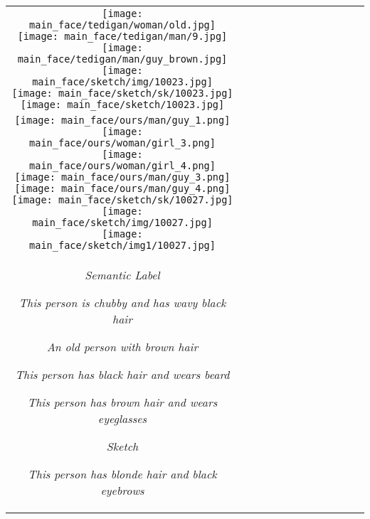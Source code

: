 \documentclass[10pt,twocolumn,letterpaper]{article}
\begin{document}
{\begin{center}
{\begin{tabular}{c c c c c c c c c c c c}
\texttt{[image: main\_face/tedigan/woman/old.jpg]}
\hspace{1mm}
\texttt{[image: main\_face/tedigan/man/9.jpg]}
\texttt{[image: main\_face/tedigan/man/guy\_brown.jpg]}
\hspace{4mm}
\texttt{[image: main\_face/sketch/img/10023.jpg]}
\texttt{[image: main\_face/sketch/sk/10023.jpg]}
\texttt{[image: main\_face/sketch/10023.jpg]}
\tabularnewline
\texttt{[image: main\_face/ours/man/guy\_1.png]}
\hspace{2mm}
\raisebox{0.15in}{\rotatebox{90}{\footnotesize OURS}}
\texttt{[image: main\_face/ours/woman/girl\_3.png]}
\texttt{[image: main\_face/ours/woman/girl\_4.png]}
\hspace{1.5mm}
\texttt{[image: main\_face/ours/man/guy\_3.png]}
\texttt{[image: main\_face/ours/man/guy\_4.png]}
\hspace{4mm}
\texttt{[image: main\_face/sketch/sk/10027.jpg]}
\texttt{[image: main\_face/sketch/img/10027.jpg]}
\texttt{[image: main\_face/sketch/img1/10027.jpg]}
\tabularnewline
\begin{minipage}{0.11\linewidth}
\vspace{-20pt}
  \hspace{-2mm}\textit{Semantic Label}
\end{minipage}
\hspace{3mm}
\begin{minipage}{0.11\linewidth}
  \textit{\color{violet}This person is chubby and has wavy black hair}
\end{minipage}
\begin{minipage}{0.11\linewidth}
\vspace{-10pt}
 \textit{\color{orange}An old person with brown hair}
\end{minipage}
\hspace{0.1mm}
\begin{minipage}{0.11\linewidth}
\vspace{0pt}
\textit{\color{violet}This person has black hair and wears beard}
\end{minipage}
\begin{minipage}{0.11\linewidth}
\vspace{0pt}
\textit{\color{orange}This person has brown hair and wears eyeglasses}
\end{minipage}
\hspace{3mm}
\begin{minipage}{0.11\linewidth}
\vspace{-20pt}
\hspace{15pt}\textit{Sketch}
\end{minipage}
\begin{minipage}{0.11\linewidth}
\textit{\color{violet}This person has blonde hair and black eyebrows}
\end{minipage}
\begin{minipage}{0.11\linewidth}


\end{minipage}
\end{tabular}}
\end{center}}
\end{document}
